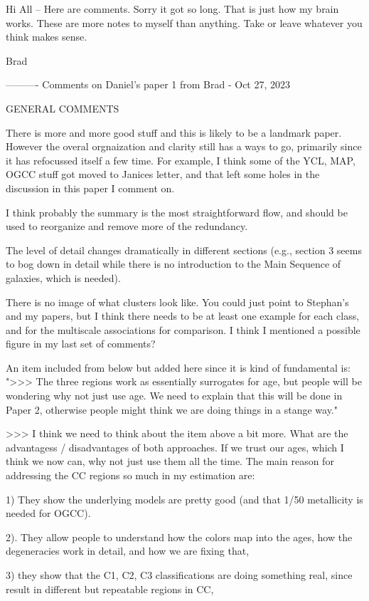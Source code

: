 Hi All – Here are comments. Sorry it got so long. That is just how my brain works. These are more notes to myself than anything. Take or leave whatever you think makes sense.
 
Brad
 
 
----------
Comments on Daniel's paper 1 from Brad - Oct 27, 2023
 
GENERAL COMMENTS
 
There is more and more good stuff and this is likely to be a landmark paper. However the overal orgnaization and clarity still has a ways to go, primarily since it has refocussed itself a few time. For example, I think some of the YCL, MAP, OGCC stuff got moved to Janices letter, and that left some holes in the discussion in this paper I comment on.
 
I think probably the summary is the most straightforward flow, and should be used to reorganize and remove more of the redundancy.
 
The level of detail changes dramatically in different sections (e.g., section 3 seems to bog down in detail while there is no introduction to the Main Sequence of galaxies, which is needed).
 
There is no image of what clusters look like. You could just point to Stephan's and my papers, but I think there needs to be at least one example for each class, and for the multiscale associations for comparison. I think I mentioned a possible figure in my last set of comments?
 
 
An item included from below but added here since it is kind of fundamental is: ">>> The three regions work  as essentially surrogates for age, but people will be wondering why not just use age. We need to explain that this will be done in Paper 2, otherwise people might think we are doing things in a stange way."
 
 
>>> I think we need to think about the item above a bit more. What are the advantagess / disadvantages of both approaches. If we trust our ages, which I think we now can, why not just use them all the time. The main reason for addressing the CC regions so much in my estimation are:
 
1) They show the underlying  models are pretty good (and that 1/50 metallicity is needed for OGCC).
 
2). They allow people to understand how the colors map into the ages, how the degeneracies work in detail, and how we are fixing that,
 
3) they show that the C1, C2, C3 classifications are doing something real, since result in different but repeatable regions in CC,
 
